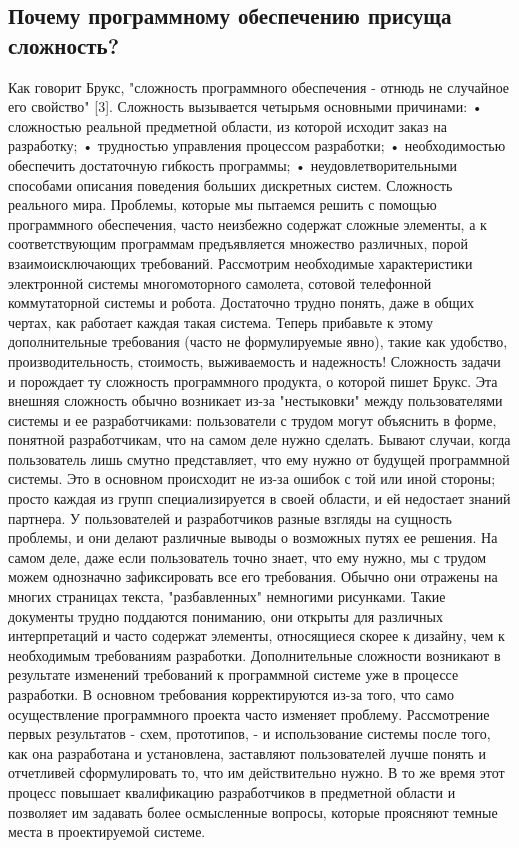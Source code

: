 \documentclass[11pt]{article}
\begin{document}
\subsection{Почему программному обеспечению присуща сложность?}
Как говорит Брукс, "сложность программного обеспечения - отнюдь не случайное его свойство" [3]. Сложность вызывается четырьмя основными причинами: 
•	сложностью реальной предметной области, из которой исходит заказ на разработку;
•	трудностью управления процессом разработки;
•	необходимостью обеспечить достаточную гибкость программы;
•	неудовлетворительными способами описания поведения больших дискретных систем.
Сложность реального мира. Проблемы, которые мы пытаемся решить с помощью программного обеспечения, часто неизбежно содержат сложные элементы, а к соответствующим программам предъявляется множество различных, порой взаимоисключающих требований. Рассмотрим необходимые характеристики электронной системы многомоторного самолета, сотовой телефонной коммутаторной системы и робота. Достаточно трудно понять, даже в общих чертах, как работает каждая такая система. Теперь прибавьте к этому дополнительные требования (часто не формулируемые явно), такие как удобство, производительность, стоимость, выживаемость и надежность! Сложность задачи и порождает ту сложность программного продукта, о которой пишет Брукс. 
Эта внешняя сложность обычно возникает из-за "нестыковки" между пользователями системы и ее разработчиками: пользователи с трудом могут объяснить в форме, понятной разработчикам, что на самом деле нужно сделать. Бывают случаи, когда пользователь лишь смутно представляет, что ему нужно от будущей программной системы. Это в основном происходит не из-за ошибок с той или иной стороны; просто каждая из групп специализируется в своей области, и ей недостает знаний партнера. У пользователей и разработчиков разные взгляды на сущность проблемы, и они делают различные выводы о возможных путях ее решения. На самом деле, даже если пользователь точно знает, что ему нужно, мы с трудом можем однозначно зафиксировать все его требования. Обычно они отражены на многих страницах текста, "разбавленных" немногими рисунками. Такие документы трудно поддаются пониманию, они открыты для различных интерпретаций и часто содержат элементы, относящиеся скорее к дизайну, чем к необходимым требованиям разработки. 
Дополнительные сложности возникают в результате изменений требований к программной системе уже в процессе разработки. В основном требования корректируются из-за того, что само осуществление программного проекта часто изменяет проблему. Рассмотрение первых результатов - схем, прототипов, - и использование системы после того, как она разработана и установлена, заставляют пользователей лучше понять и отчетливей сформулировать то, что им действительно нужно. В то же время этот процесс повышает квалификацию разработчиков в предметной области и позволяет им задавать более осмысленные вопросы, которые проясняют темные места в проектируемой системе. 
\end{document}
